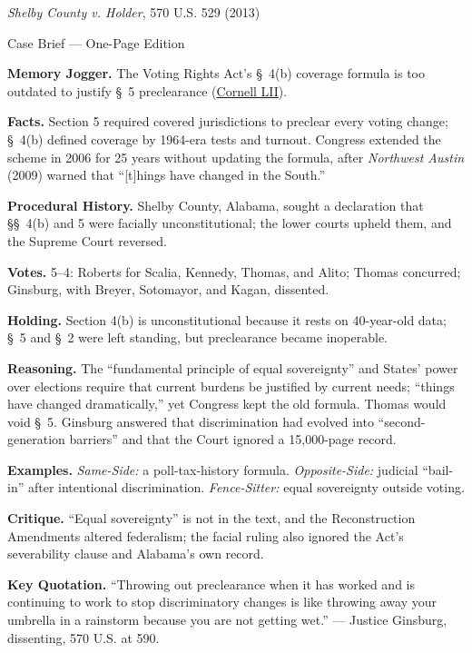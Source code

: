 \documentclass[12pt]{article}
\begin{document}
\begin{center}
{\Large \textit{Shelby County v. Holder}, 570 U.S. 529 (2013)\par}
\vspace{0.3em}
{\normalsize Case Brief --- One-Page Edition\par}
\end{center}

\textbf{Memory Jogger.} The Voting Rights Act's \S~4(b) coverage formula is too outdated to justify \S~5 preclearance (\href{https://www.law.cornell.edu/supremecourt/text/12-96}{Cornell LII}).

\textbf{Facts.} Section 5 required covered jurisdictions to preclear every voting change; \S~4(b) defined coverage by 1964-era tests and turnout. Congress extended the scheme in 2006 for 25 years without updating the formula, after \textit{Northwest Austin} (2009) warned that ``[t]hings have changed in the South.''

\textbf{Procedural History.} Shelby County, Alabama, sought a declaration that \S\S~4(b) and 5 were facially unconstitutional; the lower courts upheld them, and the Supreme Court reversed.

\textbf{Votes.} 5--4: Roberts for Scalia, Kennedy, Thomas, and Alito; Thomas concurred; Ginsburg, with Breyer, Sotomayor, and Kagan, dissented.

\textbf{Holding.} Section 4(b) is unconstitutional because it rests on 40-year-old data; \S~5 and \S~2 were left standing, but preclearance became inoperable.

\textbf{Reasoning.} The ``fundamental principle of equal sovereignty'' and States' power over elections require that current burdens be justified by current needs; ``things have changed dramatically,'' yet Congress kept the old formula. Thomas would void \S~5. Ginsburg answered that discrimination had evolved into ``second-generation barriers'' and that the Court ignored a 15,000-page record.

\textbf{Examples.} \emph{Same-Side:} a poll-tax-history formula. \emph{Opposite-Side:} judicial ``bail-in'' after intentional discrimination. \emph{Fence-Sitter:} equal sovereignty outside voting.

\textbf{Critique.} ``Equal sovereignty'' is not in the text, and the Reconstruction Amendments altered federalism; the facial ruling also ignored the Act's severability clause and Alabama's own record.

\textbf{Key Quotation.} ``Throwing out preclearance when it has worked and is continuing to work to stop discriminatory changes is like throwing away your umbrella in a rainstorm because you are not getting wet.'' --- Justice Ginsburg, dissenting, 570 U.S. at 590.
\end{document}
